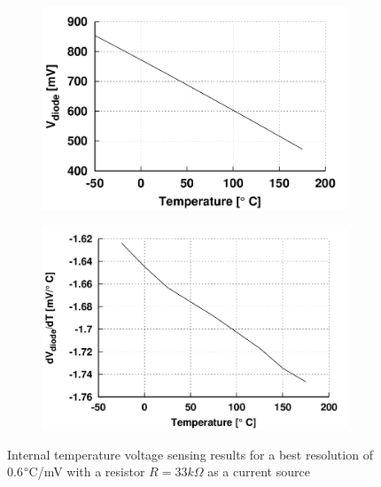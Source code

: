 \begin{figure}[htp]
    \centering
    \begin{subfigure}[b]{0.48\textwidth}
        \centering
        \includegraphics[width=\textwidth]{Chapter5/Figs/vdiode.png}
        \label{fig:vdiode}
    \end{subfigure}
    \begin{subfigure}[b]{0.48\textwidth}
        \centering
        \includegraphics[width=\textwidth]{Chapter5/Figs/vdiode_dt.png}
        \label{fig:diode_sens_temp}
    \end{subfigure}
    \caption{Internal temperature voltage sensing results for a best resolution of 0.6\(\degree\)C/mV with a resistor $R = 33 k\Omega$ as a current source}
    \label{fig:vdiode_sim}
\end{figure}

